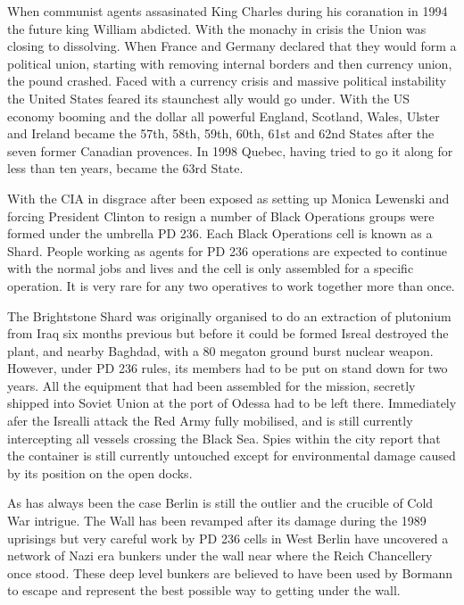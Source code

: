 \documentclass{amsart}
\begin{document}
\begin{multicols}{3}
When communist agents assasinated King Charles during his coranation
in 1994 the future king William abdicted.  With the monachy in crisis
the Union was closing to dissolving.  When France and Germany declared
that they would form a political union, starting with removing
internal borders and then currency union, the pound crashed.  Faced
with a currency crisis and massive political instability the United
States feared its staunchest ally would go under.  With the US economy
booming and the dollar all powerful England, Scotland, Wales, Ulster
and Ireland became the 57th, 58th, 59th, 60th, 61st and 62nd States
after the seven former Canadian provences.  In 1998 Quebec, having
tried to go it along for less than ten years, became the 63rd State.

With the CIA in disgrace after been exposed as setting up Monica
Lewenski and forcing President Clinton to resign a number of Black
Operations groups were formed under the umbrella PD 236.  Each Black
Operations cell is known as a Shard.  People working as agents for PD
236 operations are expected to continue with the normal jobs and lives
and the cell is only assembled for a specific operation.  It is very
rare for any two operatives to work together more than once.

The Brightstone Shard was originally organised to do an extraction of
plutonium from Iraq six months previous but before it could be formed
Isreal destroyed the plant, and nearby Baghdad, with a 80 megaton
ground burst nuclear weapon.  However, under PD 236 rules, its members
had to be put on stand down for two years.  All the equipment that had
been assembled for the mission, secretly shipped into Soviet Union at
the port of Odessa had to be left there.  Immediately afer the
Isrealli attack the Red Army fully mobilised, and is still currently
intercepting all vessels crossing the Black Sea.  Spies within the
city report that the container is still currently untouched except for
environmental damage caused by its position on the open docks.

As has always been the case Berlin is still the outlier and the
crucible of Cold War intrigue.  The Wall has been revamped after its
damage during the 1989 uprisings but very careful work by PD 236 cells
in West Berlin have uncovered a network of Nazi era bunkers under the
wall near where the Reich Chancellery once stood.  These deep level
bunkers are believed to have been used by Bormann to escape and
represent the best possible way to getting under the wall.


\end{multicols}
\end{document}
